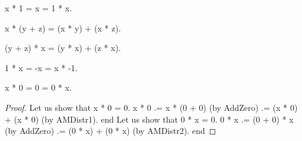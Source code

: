 \documentclass[a4paper,draft]{amsproc}
\begin{document}
\begin{forthel}
\begin{axiom}[MulUnit]
x * 1 = x = 1 * x.
\end{axiom}

\begin{axiom}[AMDistr1]
x * (y + z) = (x * y) + (x * z).
\end{axiom}

\begin{axiom}[AMDistr2]
(y + z) * x = (y * x) + (z * x).
\end{axiom}

\begin{axiom}[MulMnOne]
1 * x = -x = x * -1.
\end{axiom}

\begin{lemma}[MulZero]
x * 0 = 0 = 0 * x.
\end{lemma}
\begin{proof}
    Let us show that x * 0 = 0.
    x * 0 .= x * (0 + 0) (by AddZero) .= (x * 0) + (x * 0) (by AMDistr1).
    end %
    Let us show that 0 * x = 0.
    0 * x .= (0 + 0) * x (by AddZero) .= (0 * x) + (0 * x) (by AMDistr2).
    end
\end{proof}
\end{forthel}
\end{document}
